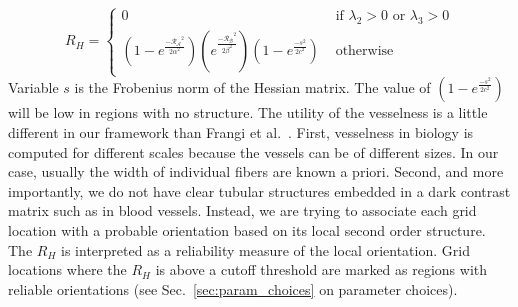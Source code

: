 $$
R_{H} = \left\{ \begin{array}{ccc}
 0 & \mbox{ if $\lambda_{2}>0$ or $\lambda_{3}>0$} \\
  (1-e^{\frac{\mathcal{-R_{A}}^{2}}{2\alpha^{2}}})
  (e^{\frac{\mathcal{-R_{B}}^{2}}{2\beta^{2}}}) (1-e^{\frac{-s^2}{2c^2}}) &\mbox{ otherwise}
       \end{array} \right.
$$
Variable $s$ is the Frobenius norm of the Hessian matrix. The value of $(1-e^{\frac{-s^2}{2c^2}})$ will be low in regions with no structure. The utility of the vesselness is a little different in our framework than Frangi et al.~\cite{Frangi1998}.
First, vesselness in biology is computed for different scales because the vessels can be of different sizes. In our case, usually the width of individual fibers are known a priori.
Second, and more importantly, we do not have clear tubular structures embedded in a dark contrast matrix such as in blood vessels.
Instead, we are trying to associate each grid location  with a probable orientation based on its local second order structure. The $R_{H}$ is interpreted as a reliability measure of the local orientation.
Grid locations where the $R_{H}$ is above a cutoff threshold are marked as regions with reliable orientations (see Sec.~\ref{sec:param_choices} on parameter choices).
